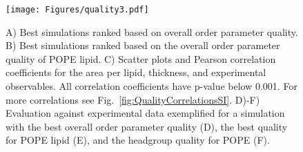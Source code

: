 \documentclass[fleqn,10pt]{wlscirep}
\begin{document}
\begin{figure}[tbp]
    \centering
    \texttt{[image: Figures/quality3.pdf]}
    \caption{ A) Best simulations ranked based on overall order parameter quality.
    B) Best simulations ranked based on the overall order parameter quality of POPE lipid. 
    C) Scatter plots and Pearson correlation coefficients for the area per lipid, thickness, and experimental observables. 
    All correlation coefficients have p-value below 0.001. For more correlations see Fig.~\ref{fig:QualityCorrelationsSI}.
    D)-F) Evaluation against experimental data exemplified for a simulation with the best overall order parameter quality (D), the best quality for POPE lipid (E), and the headgroup quality for POPE (F).
    }
    \label{fig:quality}
\end{figure}
\end{document}
